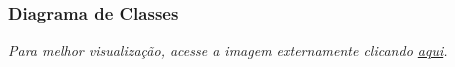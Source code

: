 \subsubsection{Diagrama de Classes}
\label{sec:DiagramaClasses}

\textit{Para melhor visualização, acesse a imagem externamente clicando \href{https://drive.google.com/file/d/1FaDMcYj23tRlHez7_HY8dnomueZytGaC/view?usp=sharing}{aqui}.}


